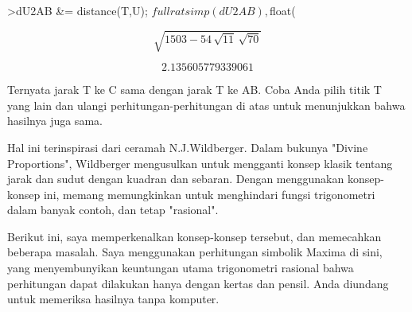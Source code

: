 \documentclass[a4paper,10pt]{article}
\begin{document}
\begin{eulernotebook}
\begin{eulercomment}
\begin{eulercomment}
\begin{eulercomment}
\begin{eulercomment}
\begin{eulercomment}
\begin{eulercomment}
\begin{eulercomment}
\begin{eulercomment}
\begin{eulercomment}
\begin{eulercomment}
\begin{eulercomment}
\begin{eulercomment}
\begin{eulercomment}
\begin{eulercomment}
\begin{eulercomment}
\begin{eulercomment}
\begin{eulercomment}
\begin{eulercomment}
\begin{eulercomment}
\begin{eulercomment}
\begin{eulercomment}
\begin{eulercomment}
\begin{eulercomment}
\begin{eulercomment}
\begin{eulercomment}
\begin{eulercomment}
\begin{eulercomment}
\begin{eulercomment}
\begin{eulercomment}
\begin{eulercomment}
\begin{eulerprompt}
>dU2AB &= distance(T,U); $fullratsimp(dU2AB), $float(%
\end{eulerprompt}
\begin{eulerformula}
\[
\sqrt{1503-54\,\sqrt{11}\,\sqrt{70}}
\]
\end{eulerformula}
\begin{eulerformula}
\[
2.135605779339061
\]
\end{eulerformula}
\begin{eulercomment}
Ternyata jarak T ke C sama dengan jarak T ke AB. Coba Anda pilih titik
T yang lain dan ulangi perhitungan-perhitungan di atas untuk
menunjukkan bahwa hasilnya juga sama.
\end{eulercomment}
\begin{eulercomment}

\begin{eulercomment}
\begin{eulercomment}
Hal ini terinspirasi dari ceramah N.J.Wildberger. Dalam bukunya
"Divine Proportions", Wildberger mengusulkan untuk mengganti konsep
klasik tentang jarak dan sudut dengan kuadran dan sebaran. Dengan
menggunakan konsep-konsep ini, memang memungkinkan untuk menghindari
fungsi trigonometri dalam banyak contoh, dan tetap "rasional".

Berikut ini, saya memperkenalkan konsep-konsep tersebut, dan
memecahkan beberapa masalah. Saya menggunakan perhitungan simbolik
Maxima di sini, yang menyembunyikan keuntungan utama trigonometri
rasional bahwa perhitungan dapat dilakukan hanya dengan kertas dan
pensil. Anda diundang untuk memeriksa hasilnya tanpa komputer.


\end{eulercomment}
\end{eulercomment}
\end{eulercomment}
\end{eulercomment}
\end{eulercomment}
\end{eulercomment}
\end{eulercomment}
\end{eulercomment}
\end{eulercomment}
\end{eulercomment}
\end{eulercomment}
\end{eulercomment}
\end{eulercomment}
\end{eulercomment}
\end{eulercomment}
\end{eulercomment}
\end{eulercomment}
\end{eulercomment}
\end{eulercomment}
\end{eulercomment}
\end{eulercomment}
\end{eulercomment}
\end{eulercomment}
\end{eulercomment}
\end{eulercomment}
\end{eulercomment}
\end{eulercomment}
\end{eulercomment}
\end{eulercomment}
\end{eulercomment}
\end{eulercomment}
\end{eulercomment}
\end{eulercomment}
\end{eulernotebook}
\end{document}
